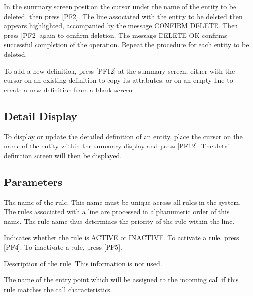 \documentclass[letterpaper,10pt,english]{sphinxmanual}
\begin{document}
\sphinxAtStartPar
{} \sphinxhyphen{} In the summary screen position the cursor under the name of the entity to be deleted, then press {[}PF2{]}. The line associated with the entity to be deleted then appears highlighted, accompanied by the message CONFIRM DELETE. Then press {[}PF2{]} again to confirm deletion. The message DELETE OK confirms successful completion of the operation. Repeat the procedure for each entity to be deleted.

\sphinxAtStartPar
{} \sphinxhyphen{} To add a new definition, press {[}PF12{]} at the summary screen, either with the cursor on an existing definition to copy its attributes, or on an empty line to create a new definition from a blank screen.

\ignorespaces 

\subsection{Detail Display}
\label{\detokenize{connectivity_guide:index-92}}\label{\detokenize{connectivity_guide:id46}}
\sphinxAtStartPar
To display or update the detailed definition of an entity, place the cursor on the name of the entity within the summary display and press {[}PF12{]}. The detail definition screen will then be displayed.

\sphinxAtStartPar
{}

\ignorespaces 

\subsection{Parameters}
\label{\detokenize{connectivity_guide:index-93}}\label{\detokenize{connectivity_guide:id47}}\begin{description}
\sphinxAtStartPar
The name of the rule. This name must be unique across all rules in the system. The rules associated with a line are processed in alphanumeric order of this name. The rule name thus determines the priority of the rule within the line.

\sphinxAtStartPar
Indicates whether the rule is ACTIVE or INACTIVE. To activate a rule, press {[}PF4{]}. To inactivate a rule, press {[}PF5{]}.

\sphinxAtStartPar
Description of the rule. This information is not used.

\sphinxAtStartPar
The name of the entry point which will be assigned to the incoming call if this rule matches the call characteristics.

\end{description}
\end{document}
